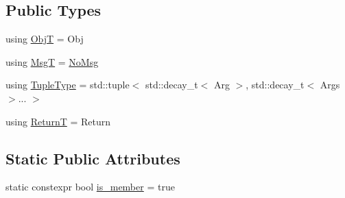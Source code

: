 \subsection*{Public Types}
\begin{DoxyCompactItemize}
\item 
using \hyperlink{structvt_1_1util_1_1fntraits_1_1detail_1_1_obj_func_traits_impl_3_01std_1_1enable__if__t_3_01not1219121971b8d08f950169835519afd3_a863417e4886851735f953891e69aeb98}{ObjT} = Obj
\item 
using \hyperlink{structvt_1_1util_1_1fntraits_1_1detail_1_1_obj_func_traits_impl_3_01std_1_1enable__if__t_3_01not1219121971b8d08f950169835519afd3_a75e8b554f75ee5b8e792f070e6abc00e}{MsgT} = \hyperlink{structvt_1_1util_1_1fntraits_1_1detail_1_1_no_msg}{No\+Msg}
\item 
using \hyperlink{structvt_1_1util_1_1fntraits_1_1detail_1_1_obj_func_traits_impl_3_01std_1_1enable__if__t_3_01not1219121971b8d08f950169835519afd3_aac475dfbd9d153be1039d57eaf8ef934}{Tuple\+Type} = std\+::tuple$<$ std\+::decay\+\_\+t$<$ Arg $>$, std\+::decay\+\_\+t$<$ Args $>$... $>$
\item 
using \hyperlink{structvt_1_1util_1_1fntraits_1_1detail_1_1_obj_func_traits_impl_3_01std_1_1enable__if__t_3_01not1219121971b8d08f950169835519afd3_ac626d51f58f053e259a7b7fb8e9a01bb}{ReturnT} = Return
\end{DoxyCompactItemize}
\subsection*{Static Public Attributes}
\begin{DoxyCompactItemize}
\item 
static constexpr bool \hyperlink{structvt_1_1util_1_1fntraits_1_1detail_1_1_obj_func_traits_impl_3_01std_1_1enable__if__t_3_01not1219121971b8d08f950169835519afd3_a93daf08a6d7020b2a2b01f342311fb37}{is\+\_\+member} = true
\end{DoxyCompactItemize}



